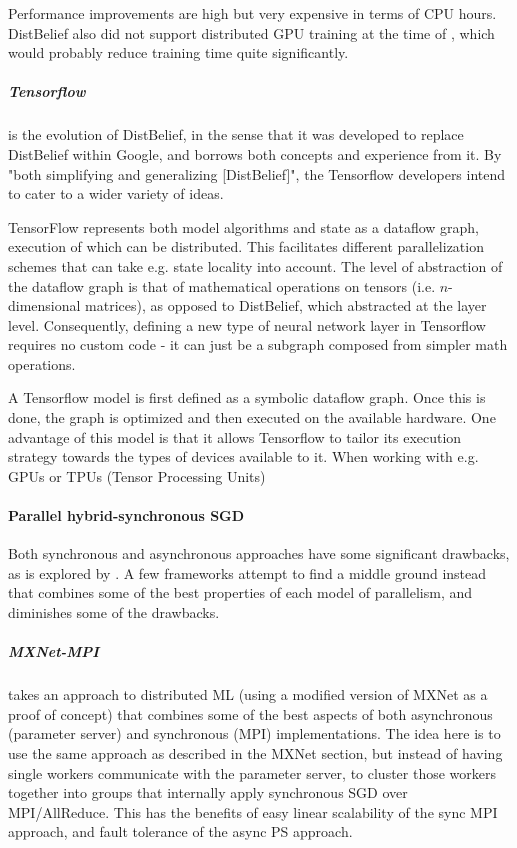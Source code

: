 Performance improvements are high but very expensive in terms of CPU hours. DistBelief also did not support distributed GPU training at the time of \citet{DistBelief2012}, which would probably reduce training time quite significantly.

\subparagraph{Tensorflow \citep{Tensorflow2015}\citep{Tensorflow2016}}

is the evolution of DistBelief, in the sense that it was developed to replace DistBelief within Google, and borrows both concepts and experience from it. By "both simplifying and generalizing [DistBelief]"\citep{Tensorflow2016}, the Tensorflow developers intend to cater to a wider variety of ideas.

TensorFlow represents both model algorithms and state as a dataflow graph, execution of which can be distributed. This facilitates different parallelization schemes that can take e.g. state locality into account. The level of abstraction of the dataflow graph is that of mathematical operations on tensors (i.e. $n$-dimensional matrices), as opposed to DistBelief, which abstracted at the layer level. Consequently, defining a new type of neural network layer in Tensorflow requires no custom code - it can just be a subgraph composed from simpler math operations.

A Tensorflow model is first defined as a symbolic dataflow graph. Once this is done, the graph is optimized and then executed on the available hardware. One advantage of this model is that it allows Tensorflow to tailor its execution strategy towards the types of devices available to it. When working with e.g. GPUs or TPUs (Tensor Processing Units\citep{TPU2017})


\paragraph{Parallel hybrid-synchronous SGD}

Both synchronous and asynchronous approaches have some significant drawbacks, as is explored by \citet{ChenJianmin2016}. A few frameworks attempt to find a middle ground instead that combines some of the best properties of each model of parallelism, and diminishes some of the drawbacks.

\subparagraph{MXNet-MPI \citep{Mamidala2018}}

takes an approach to distributed ML (using a modified version of MXNet as a proof of concept) that combines some of the best aspects of both asynchronous (parameter server) and synchronous (MPI) implementations. The idea here is to use the same approach as described in the MXNet section, but instead of having single workers communicate with the parameter server, to cluster those workers together into groups that internally apply synchronous SGD over MPI/AllReduce. This has the benefits of easy linear scalability of the sync MPI approach, and fault tolerance of the async PS approach.


